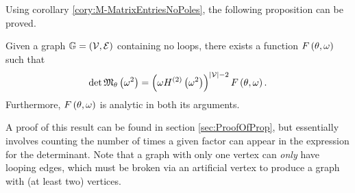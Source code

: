Using corollary \ref{cory:M-MatrixEntriesNoPoles}, the following proposition can be proved.
\begin{prop} \label{prop:MMatrixDetForm}
	Given a graph $\mathbb{G} = \left( \mathcal{V}, \mathcal{E} \right)$ containing no loops, there exists a function $F\left( \theta,\omega \right)$ such that
	\begin{align} \label{eq:MMatrixDetForm}
		\det\mathfrak{M}_\theta\left( \omega^2 \right) = \left(  \omega H^{(2)}\left( \omega^2 \right)  \right)^{\left\lvert \mathcal{V} \right\rvert-2} F\left( \theta,\omega \right).
	\end{align}
	Furthermore, $F\left( \theta,\omega \right)$ is analytic in both its arguments.
\end{prop}
A proof of this result can be found in section \ref{sec:ProofOfProp}, but essentially involves counting the number of times a given factor can appear in the expression for the determinant.
Note that a graph with only one vertex can \emph{only} have looping edges, which must be broken via an artificial vertex to produce a graph with (at least two) vertices.

